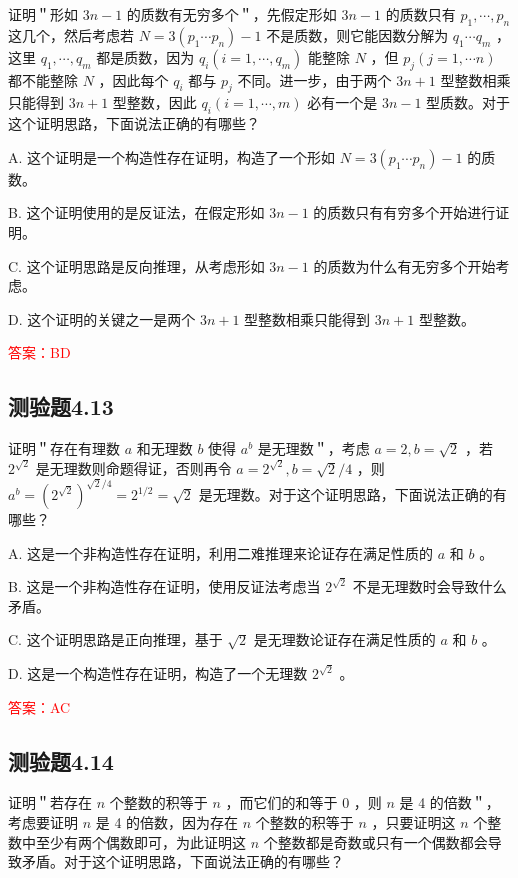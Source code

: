 \documentclass[UTF8, heading=true]{ctexart}
\begin{document}
证明＂形如 $3 n-1$ 的质数有无穷多个＂，先假定形如 $3 n-1$ 的质数只有 $p_1, \cdots, p_n$ 这几个，然后考虑若 $N=3\left(p_1 \cdots p_n\right)-1$ 不是质数，则它能因数分解为 $q_1 \cdots q_m$ ，这里 $q_1, \cdots, q_m$ 都是质数，因为 $q_i\left(i=1, \cdots, q_m\right)$ 能整除 $N$ ，但 $p_j(j=1, \cdots n)$ 都不能整除 $N$ ，因此每个 $q_i$ 都与 $p_j$ 不同。进一步，由于两个 $3 n+1$ 型整数相乘只能得到 $3 n+1$ 型整数，因此 $q_i(i=1, \cdots, m)$ 必有一个是 $3 n-1$ 型质数。对于这个证明思路，下面说法正确的有哪些？

A. 
这个证明是一个构造性存在证明，构造了一个形如 $N=3\left(p_1 \cdots p_n\right)-1$ 的质数。

B. 
这个证明使用的是反证法，在假定形如 $3 n-1$ 的质数只有有穷多个开始进行证明。

C. 
这个证明思路是反向推理，从考虑形如 $3 n-1$ 的质数为什么有无穷多个开始考虑。

D. 
这个证明的关键之一是两个 $3 n+1$ 型整数相乘只能得到 $3 n+1$ 型整数。

\textcolor{red}{答案：BD}

\subsection{测验题4.13}

证明＂存在有理数 $a$ 和无理数 $b$ 使得 $a^b$ 是无理数＂，考虑 $a=2, b=\sqrt{2}$ ，若 $2^{\sqrt{2}}$ 是无理数则命题得证，否则再令 $a=2^{\sqrt{2}}, b=\sqrt{2} / 4$ ，则 $a^b=\left(2^{\sqrt{2}}\right)^{\sqrt{2} / 4}=2^{1 / 2}=\sqrt{2}$ 是无理数。对于这个证明思路，下面说法正确的有哪些？

A. 这是一个非构造性存在证明，利用二难推理来论证存在满足性质的 $a$ 和 $b$ 。

B. 这是一个非构造性存在证明，使用反证法考虑当 $2^{\sqrt{2}}$ 不是无理数时会导致什么矛盾。

C. 这个证明思路是正向推理，基于 $\sqrt{2}$ 是无理数论证存在满足性质的 $a$ 和 $b$ 。

D. 这是一个构造性存在证明，构造了一个无理数 $2^{\sqrt{2}}$ 。

\textcolor{red}{答案：AC}


\subsection{测验题4.14}

证明＂若存在 $n$ 个整数的积等于 $n$ ，而它们的和等于 0 ，则 $n$ 是 4 的倍数＂，考虑要证明 $n$ 是 4 的倍数，因为存在 $n$ 个整数的积等于 $n$ ，只要证明这 $n$ 个整数中至少有两个偶数即可，为此证明这 $n$ 个整数都是奇数或只有一个偶数都会导致矛盾。对于这个证明思路，下面说法正确的有哪些？
\end{document}
